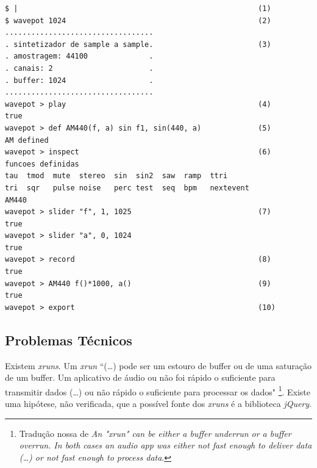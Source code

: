 \begin{listing}
\begin{verbatim}
$ |                                                       (1)
$ wavepot 1024                                            (2)
..................................
. sintetizador de sample a sample.                        (3) 
. amostragem: 44100              .
. canais: 2                      .
. buffer: 1024                   .
..................................
wavepot > play                                            (4)                                                      
true
wavepot > def AM440(f, a) sin f1, sin(440, a)             (5)
AM defined
wavepot > inspect                                         (6)
funcoes definidas 
tau  tmod  mute  stereo  sin  sin2  saw  ramp  ttri
tri  sqr   pulse noise	 perc test  seq  bpm   nextevent
AM440
wavepot > slider "f", 1, 1025                             (7)
true
wavepot > slider "a", 0, 1024            
true
wavepot > record                                          (8)
true
wavepot > AM440 f()*1000, a()                             (9)
true
wavepot > export                                          (10)
\end{verbatim}
\tiny{\caption{Ptty aguardando dados de entrada do improvisador (1). \emph{Boot} do ambiente \emph{wavepot} com um buffer de 1024 amostras por ciclo de DSP (2). Informações diversas do sistema (3). Execução do DSP (4). Definição de uma função \emph{AM440} (5). Informações sobre as funções diponíveis (6). Definição de GUIs (7). Gravação em um arquivo de áudio (8). Execução da função \emph{AM440} com controles (9). Download da gravação (10)}}
\label{code:resultados}
\end{listing}

\subsection*{Problemas Técnicos}

Existem \emph{xruns}. Um \emph{xrun} ``(\ldots) pode ser um estouro de buffer ou de uma saturação de um buffer. Um aplicativo de áudio ou não foi rápido o suficiente para transmitir dados (\ldots) ou não rápido o suficiente para processar os dados" \cite{markc_xruns_2013}\footnote{Tradução nossa de \emph{An "xrun" can be either a buffer underrun or a buffer overrun. In both cases an audio app was either not fast enough to deliver data (\ldots)  or not fast enough to process data}.}. Existe uma hipótese, não verificada, que a possível fonte dos \emph{xruns} é a biblioteca \emph{jQuery}. 